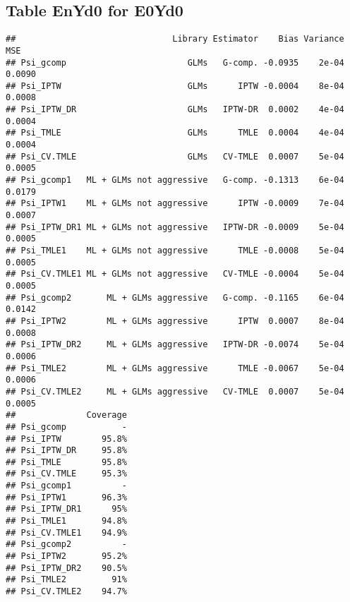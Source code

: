 \documentclass[11pt]{article}\usepackage[]{graphicx}\usepackage[]{color}
\makeatletter
\newenvironment{kframe}{%
 \def\at@end@of@kframe{}%
 \ifinner\ifhmode%
  \def\at@end@of@kframe{\end{minipage}}%
  \begin{minipage}{\columnwidth}%
 \fi\fi%
 \def\FrameCommand##1{\hskip\@totalleftmargin \hskip-\fboxsep
 \colorbox{shadecolor}{##1}\hskip-\fboxsep
     \hskip-\linewidth \hskip-\@totalleftmargin \hskip\columnwidth}%
 \MakeFramed {\advance\hsize-\width
   \@totalleftmargin\z@ \linewidth\hsize
   \@setminipage}}%
 {\par\unskip\endMakeFramed%
 \at@end@of@kframe}
\newenvironment{knitrout}{}{} %
\makeatother
\begin{document}
\subsection{Table EnYd0 for E0Yd0}
\begin{knitrout}
\color{fgcolor}\begin{kframe}
\begin{verbatim}
##                               Library Estimator    Bias Variance    MSE
## Psi_gcomp                        GLMs   G-comp. -0.0935    2e-04 0.0090
## Psi_IPTW                         GLMs      IPTW -0.0004    8e-04 0.0008
## Psi_IPTW_DR                      GLMs   IPTW-DR  0.0002    4e-04 0.0004
## Psi_TMLE                         GLMs      TMLE  0.0004    4e-04 0.0004
## Psi_CV.TMLE                      GLMs   CV-TMLE  0.0007    5e-04 0.0005
## Psi_gcomp1   ML + GLMs not aggressive   G-comp. -0.1313    6e-04 0.0179
## Psi_IPTW1    ML + GLMs not aggressive      IPTW -0.0009    7e-04 0.0007
## Psi_IPTW_DR1 ML + GLMs not aggressive   IPTW-DR -0.0009    5e-04 0.0005
## Psi_TMLE1    ML + GLMs not aggressive      TMLE -0.0008    5e-04 0.0005
## Psi_CV.TMLE1 ML + GLMs not aggressive   CV-TMLE -0.0004    5e-04 0.0005
## Psi_gcomp2       ML + GLMs aggressive   G-comp. -0.1165    6e-04 0.0142
## Psi_IPTW2        ML + GLMs aggressive      IPTW  0.0007    8e-04 0.0008
## Psi_IPTW_DR2     ML + GLMs aggressive   IPTW-DR -0.0074    5e-04 0.0006
## Psi_TMLE2        ML + GLMs aggressive      TMLE -0.0067    5e-04 0.0006
## Psi_CV.TMLE2     ML + GLMs aggressive   CV-TMLE  0.0007    5e-04 0.0005
##              Coverage
## Psi_gcomp           -
## Psi_IPTW        95.8%
## Psi_IPTW_DR     95.8%
## Psi_TMLE        95.8%
## Psi_CV.TMLE     95.3%
## Psi_gcomp1          -
## Psi_IPTW1       96.3%
## Psi_IPTW_DR1      95%
## Psi_TMLE1       94.8%
## Psi_CV.TMLE1    94.9%
## Psi_gcomp2          -
## Psi_IPTW2       95.2%
## Psi_IPTW_DR2    90.5%
## Psi_TMLE2         91%
## Psi_CV.TMLE2    94.7%
\end{verbatim}
\end{kframe}
\end{knitrout}
\end{document}
